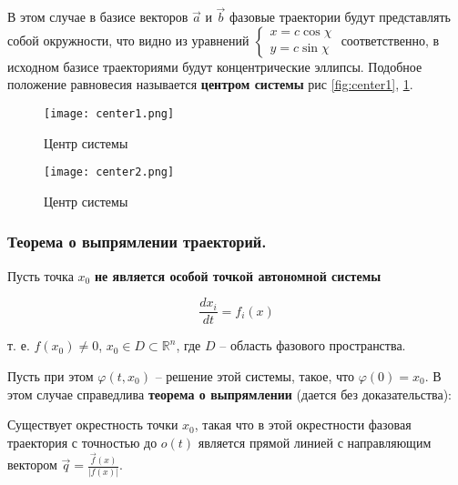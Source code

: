 \documentclass[a4paper, 12pt]{article}
\begin{document}
\begin{enumerate}
\begin{enumerate}
      В этом случае в базисе векторов $\vec{a}$ и $\vec{b}$ фазовые траектории будут представлять собой окружности, что видно из уравнений 
      $
      \begin{cases}
        x = c \cos {\chi} \\
        y = c \sin {\chi}
      \end{cases}
      $ соответственно, в исходном базисе траекториями будут концентрические эллипсы. Подобное положение равновесия называется \textbf{центром системы} рис \ref{fig:center1}, \ref{fig:center2}.

      \begin{figure}[h!]
        \begin{center}
            \begin{minipage}[h!]{0.48\linewidth}
                \texttt{[image: center1.png]}
                \caption{Центр системы}
                \label{fig:center1}
            \end{minipage}
            \hfill
            \begin{minipage}[h!]{0.48\linewidth}
                \texttt{[image: center2.png]}
                \caption{Центр системы}
                \label{fig:center2}
            \end{minipage}
        \end{center}
      \end{figure}

      \end{enumerate}

    \end{enumerate}

    \subsubsection{Теорема о выпрямлении траекторий.}

    Пусть точка $x_0$ \textbf{не является особой точкой автономной системы} 

    \begin{equation}
      \frac{d x_i}{d t} = f_i(x)
    \end{equation}

    т. е. $f(x_0) \neq 0$, $x_0 \in D \subset \mathbb{R}^n$, где $D$ -- область фазового пространства. 

    Пусть при этом $\varphi(t, x_0)$ -- решение этой системы, такое, что $\varphi(0) = x_0$. В этом случае справедлива \textbf{теорема о выпрямлении} (дается без доказательства):

    \begin{theorem}
      Существует окрестность точки $x_0$, такая что в этой окрестности фазовая траектория с точностью до $o(t)$ является прямой линией с направляющим вектором $\vec{q} = \frac{\vec{f}(x)}{|f(x)|}$.
    \end{theorem}
\end{document}
